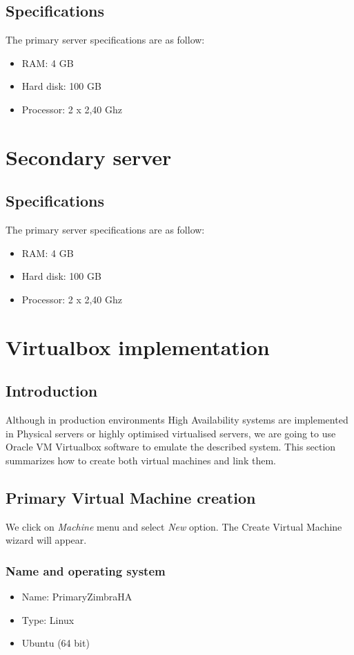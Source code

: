 \subsection {Specifications}
The primary server specifications are as follow:
\begin{itemize}
  \item RAM: 4 GB
  \item Hard disk: 100 GB
  \item Processor: 2 x 2,40 Ghz
\end{itemize}

\section {Secondary server}
\subsection {Specifications}
The primary server specifications are as follow:
\begin{itemize}
  \item RAM: 4 GB
  \item Hard disk: 100 GB
  \item Processor: 2 x 2,40 Ghz
\end{itemize}

\section {\label{sec:virtualbox-implementation}Virtualbox implementation}
\subsection {Introduction}
Although in production environments High Availability systems are implemented in Physical servers or highly optimised virtualised servers, we are going to use Oracle VM Virtualbox software to emulate the described system. This section summarizes how to create both virtual machines and link them.

\subsection {\label{subsec:primary-virtual-machine-creation}Primary Virtual Machine creation}
We click on \textit{Machine} menu and select \textit{New} option. The Create Virtual Machine wizard will appear.

\subsubsection {Name and operating system}
\begin{itemize}
  \item Name: PrimaryZimbraHA
  \item Type: Linux
  \item Ubuntu (64 bit)
\end{itemize}

